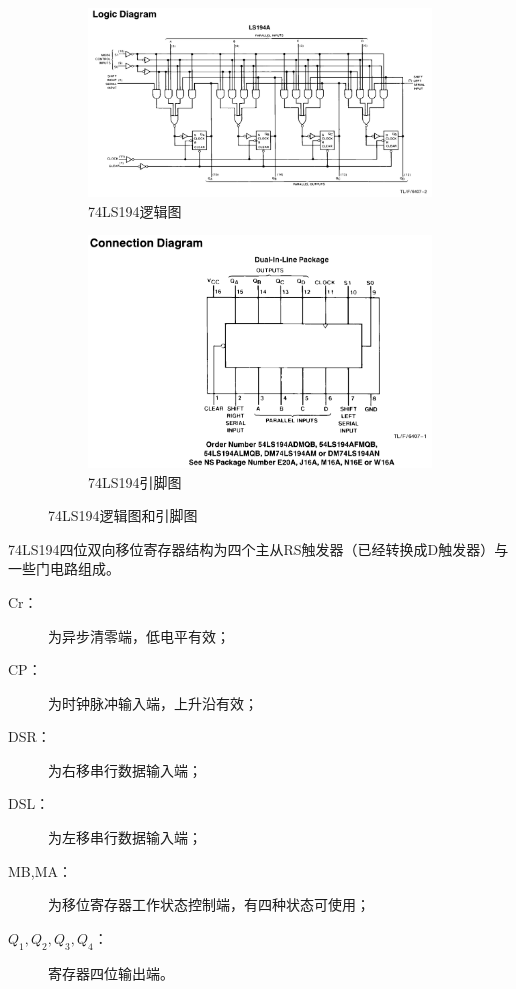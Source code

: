 \documentclass{ctexrep}
\begin{document}
\begin{figure}[htpb]
	\centering
	\begin{subfigure}[htpb]{.45\linewidth}
		\centering
		\includegraphics[width=\linewidth]{74LS194002.png}
		\caption{74LS194逻辑图}
		\label{fig:74LS194逻辑图}
	\end{subfigure}
	\quad
	\begin{subfigure}[htpb]{.45\linewidth}
		\centering
		\includegraphics[width=\linewidth]{74LS194001.png}
		\caption{74LS194引脚图}
		\label{fig:74LS194引脚图}
	\end{subfigure}
	\caption{74LS194逻辑图和引脚图}
	\label{fig:74LS194逻辑图和引脚图}
\end{figure}

74LS194四位双向移位寄存器结构为四个主从RS触发器（已经转换成D触发器）与一些门电路组成。

\begin{description}
	\item[Cr：]为异步清零端，低电平有效；
	\item[CP：]为时钟脉冲输入端，上升沿有效；
	\item[DSR：]为右移串行数据输入端；
	\item[DSL：]为左移串行数据输入端；
	\item[MB,MA：]为移位寄存器工作状态控制端，有四种状态可使用；
	\item[$ Q_1,Q_2,Q_3,Q_4 $：]寄存器四位输出端。
\end{description}
\end{document}
